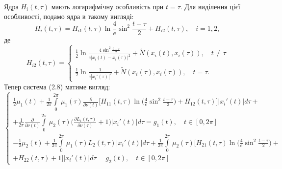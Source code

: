\documentclass[a4 paper,12pt,ukrainian]{report}
\begin{document}
\hspace*{\parindent}Ядра $H_{i}(t,\tau)$ мають логарифмічну особливість при $t=\tau$. Для виділення цієї особливості, подамо ядра в такому вигляді:
\begin{equation*}
H_{i}(t,\tau)=H_{i1}(t,\tau)\ln{\frac{4}{e}\sin^2\frac{t-\tau}{2}}+H_{i2}(t,\tau), \quad i=1,2,
\end{equation*}
де
\begin{equation*}
H_{i2}(t,\tau)=\left\{
\begin{array}{l}
\displaystyle
\frac{1}{2}\ln{\frac{4\sin^2\frac{t-\tau}{2}}{e|x_{i}(t)-x_{i}(\tau)|^2}}+\tilde{N}(x_{i}(t),x_{i}(\tau)), \quad t\neq\tau\\ \\
\displaystyle
\frac{1}{2}\ln{\frac{1}{e|x_{i}'(\tau)|^2}}+\tilde{N}(x_{i}(\tau),x_{i}(\tau)), \quad t=\tau.
\end{array}
\right.
\end{equation*}
\hspace*{\parindent}Тепер система (2.8) матиме вигляд:
\begin{equation}
\left\{
\begin{array}{c}
\displaystyle
\frac{1}{2}\mu_1(t) + \frac{1}{2\pi}\int\limits_{0}^{2\pi} \,\mu_1(\tau)\frac{\partial}{\partial\nu(t)}\Big[H_{11}(t,\tau)\ln{\Big(\frac{4}{e}\sin^2\frac{t-\tau}{2}\Big)}+H_{12}(t,\tau)\Big]|x_{i}'(t)|d\tau+\\
\displaystyle
+\frac{1}{2\pi}\frac{\partial}{\partial{\nu(t)}}\int\limits_{0}^{2\pi} \,\mu_2(\tau)\bigg(\frac{\partial L_{1}(t,\tau)}{\partial\nu(\tau)} + 1\bigg)|x_{i}'(t)|d\tau=g_1(t),\quad  t \in [0, 2\pi]\\
\displaystyle
-\frac{1}{2}\mu_2(t) + \frac{1}{2\pi}\int\limits_{0}^{2\pi} \,\mu_1(\tau)L_{2}(t,\tau)|x_{i}'(t)|d\tau+\frac{1}{2\pi}\int\limits_{0}^{2\pi} \,\mu_2 (\tau)\Big[H_{21}(t,\tau)\ln{\Big(\frac{4}{e}\sin^2\frac{t-\tau}{2}\Big)}+\\
\displaystyle
+H_{22}(t,\tau)+ 1\Big]|x_{i}'(t)|d\tau=g_2(t),\quad  t \in [0, 2\pi]
\end{array}
\right.
\end{equation}
\end{document}
